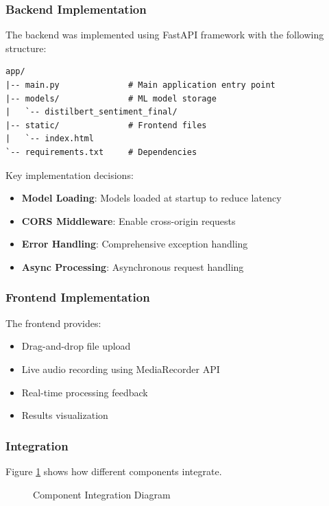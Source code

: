 \documentclass[12pt,a4paper]{report}
\begin{document}
\subsubsection{Backend Implementation}
The backend was implemented using FastAPI framework with the following structure:

\begin{verbatim}
app/
|-- main.py              # Main application entry point
|-- models/              # ML model storage
|   `-- distilbert_sentiment_final/
|-- static/              # Frontend files
|   `-- index.html
`-- requirements.txt     # Dependencies
\end{verbatim}

Key implementation decisions:

\begin{itemize}
    \item \textbf{Model Loading}: Models loaded at startup to reduce latency
    \item \textbf{CORS Middleware}: Enable cross-origin requests
    \item \textbf{Error Handling}: Comprehensive exception handling
    \item \textbf{Async Processing}: Asynchronous request handling
\end{itemize}

\subsubsection{Frontend Implementation}
The frontend provides:

\begin{itemize}
    \item Drag-and-drop file upload
    \item Live audio recording using MediaRecorder API
    \item Real-time processing feedback
    \item Results visualization
\end{itemize}

\subsubsection{Integration}
Figure \ref{fig:component_integration} shows how different components integrate.

\begin{figure}[H]
    \centering
    
    \caption{Component Integration Diagram}
    \label{fig:component_integration}
\end{figure}
\end{document}

